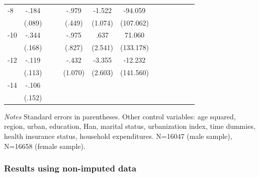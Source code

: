 \begin{table}[p]
\begin{adjustbox}{max width=\linewidth}
\begin{threeparttable}
{\begin{tabular}{l*{6}{S
S}}
-8             &    -.184\sym{**} &         &         &    -.979\sym{**} &   -1.522         &  -94.059         \\
                &   (.089)         &         &         &   (.449)         &  (1.074)         &(107.062)         \\
-10            &    -.344\sym{**} &         &         &    -.975         &     .637         &   71.060         \\
                &   (.168)         &         &         &   (.827)         &  (2.541)         &(133.178)         \\
-12           &    -.119         &         &         &    -.432         &   -3.355         &  -12.232         \\
                &   (.113)         &         &         &  (1.070)         &  (2.603)         &(141.560)         \\
-14           &    -.106         &         &         &                  &                  &                  \\
                &   (.152)         &         &         &                  &                  &                  \\
\bottomrule
\end{tabular}
\begin{tablenotes}
\item \textit{Notes}   Standard errors in parentheses.
Other control variables: age squared, region, urban, education, Han, marital status, urbanization index, time dummies, health insurance status, household expenditures. N=16047 (male sample), N=16658 (female sample).
\end{tablenotes}
}
\end{threeparttable}
\end{adjustbox}
\end{table}

\FloatBarrier
\clearpage
\subsubsection*{Results using non-imputed data}

